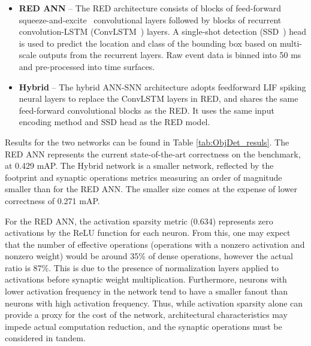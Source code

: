     \begin{itemize}
        \item \textbf{RED ANN} -- The RED architecture \cite{Perot2020} consists of blocks of feed-forward squeeze-and-excite~\cite{hu18squeeze} convolutional layers followed by blocks of recurrent convolution-LSTM (ConvLSTM~\cite{shi15convlstm}) layers.
        A single-shot detection (SSD~\cite{Liu_2016}) head is used to predict the location and class of the bounding box based on multi-scale outputs from the recurrent layers. 
        Raw event data is binned into 50 ms and pre-processed into time surfaces. 
        \item \textbf{Hybrid} -- The hybrid ANN-SNN architecture adopts feedforward LIF spiking neural layers to replace the ConvLSTM layers in RED, and shares the same feed-forward convolutional blocks as the RED. It uses the same input encoding method and SSD head as the RED model. 
    \end{itemize}

    Results for the two networks can be found in Table \ref{tab:ObjDet_resuls}. The RED ANN represents the current state-of-the-art correctness on the benchmark, at 0.429 mAP. The Hybrid network is a smaller network, reflected by the footprint and synaptic operations metrics measuring an order of magnitude smaller than for the RED ANN. The smaller size comes at the expense of lower correctness of 0.271 mAP.

    For the RED ANN, the activation sparsity metric (0.634) represents zero activations by the ReLU function for each neuron. From this, one may expect that the number of effective operations (operations with a nonzero activation and nonzero weight) would be around 35\% of dense operations, however the actual ratio is 87\%. This is due to the presence of normalization layers applied to activations before synaptic weight multiplication. Furthermore, neurons with lower activation frequency in the network tend to have a smaller fanout than neurons with high activation frequency. Thus, while activation sparsity alone can provide a proxy for the cost of the network, architectural characteristics may impede actual computation reduction, and the synaptic operations must be considered in tandem.


